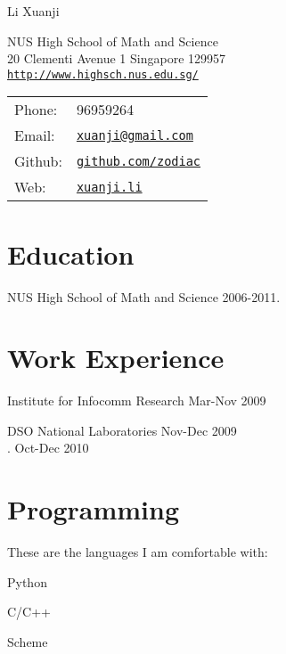 \documentclass[letterpaper]{article}
\def\name{Li Xuanji}
\renewenvironment{itemize}{
  \begin{list}{}{
    \setlength{\leftmargin}{1.5em}
  }
}{
  \end{list}
}
\begin{document}
{\huge \name}

\vspace{0.25in}


\begin{minipage}{0.45\linewidth}
  NUS High School of Math and Science \\
  20 Clementi Avenue 1 Singapore 129957 \\
  \href{http://www.highsch.nus.edu.sg/}{\tt http://www.highsch.nus.edu.sg/}
\end{minipage}
\begin{minipage}{0.45\linewidth}
  \begin{tabular}{ll}
    Phone: & 96959264 \\
    Email: & \href{mailto:xuanji@gmail.com}{\tt xuanji@gmail.com} \\
    Github: & \href{https://github.com/zodiac}{\tt github.com/zodiac} \\
    Web: &\href{xuanji.li}{\tt xuanji.li}
  \end{tabular}
\end{minipage}


\section*{Education}


\begin{itemize}
  \item NUS High School of Math and Science \hfill 2006-2011.
\end{itemize}


\section*{Work Experience}


\begin{itemize}
  \item Institute for Infocomm Research \hfill Mar-Nov 2009
  \item DSO National Laboratories \hfill Nov-Dec 2009 \\
. \hfill Oct-Dec 2010
\end{itemize}


\section*{Programming}
These are the languages I am comfortable with:
  \begin{itemize}
  \item{Python}
  \item{C/C++}
  \item{Scheme}
  \end{itemize}
\end{document}
